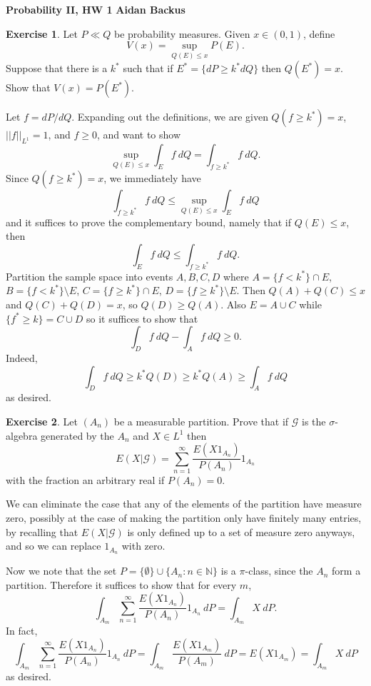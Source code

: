 \documentclass[10pt]{article}
\newcommand{\NN}{\mathbb{N}}
\theoremstyle{definition}
\newtheorem{exer}{Exercise}
\begin{document}
\noindent
\large\textbf{Probability II, HW 1} \hfill \textbf{Aidan Backus} \\

\begin{exer}
Let $P \ll Q$ be probability measures. Given $x \in (0, 1)$, define
$$V(x) = \sup_{Q(E) \leq x} P(E).$$
Suppose that there is a $k^*$ such that if $E^* = \{dP \geq k^* dQ\}$ then $Q(E^*) = x$.
Show that $V(x) = P(E^*)$.
\end{exer}

Let $f = dP/dQ$. Expanding out the definitions, we are given $Q(f \geq k^*) = x$, $||f||_{L^1} = 1$, and $f \geq 0$, and want to show
$$\sup_{Q(E) \leq x} \int_E f~dQ = \int_{f \geq k^*} f ~dQ.$$
Since $Q(f \geq k^*) = x$, we immediately have
$$\int_{f \geq k^*} f ~dQ \leq \sup_{Q(E) \leq x} \int_E f~dQ$$
and it suffices to prove the complementary bound, namely that if $Q(E) \leq x$, then
$$\int_E f ~dQ \leq \int_{f \geq k^*} f~dQ.$$
Partition the sample space into events $A,B,C,D$ where $A = \{f < k^*\} \cap E$, $B = \{f < k^*\} \setminus E$, $C = \{f \geq k^*\} \cap E$, $D = \{f \geq k^*\} \setminus E$.
Then $Q(A) + Q(C) \leq x$ and $Q(C) + Q(D) = x$, so $Q(D) \geq Q(A)$.
Also $E = A \cup C$ while $\{f^* \geq k\} = C \cup D$ so it suffices to show that
$$\int_D f~dQ - \int_A f~dQ \geq 0.$$
Indeed,
$$\int_D f~dQ \geq k^*Q(D) \geq k^*Q(A) \geq \int_A f~dQ$$
as desired.


\begin{exer}
Let $(A_n)$ be a measurable partition. Prove that if $\mathcal G$ is the $\sigma$-algebra generated by the $A_n$ and $X \in L^1$ then
$$E(X|\mathcal G) = \sum_{n=1}^\infty \frac{E(X1_{A_n})}{P(A_n)} 1_{A_n}$$
with the fraction an arbitrary real if $P(A_n) = 0$.
\end{exer}

We can eliminate the case that any of the elements of the partition have measure zero, possibly at the case of making the partition only have finitely many entries, by recalling that $E(X|\mathcal G)$ is only defined up to a set of measure zero anyways, and so we can replace $1_{A_n}$ with zero.

Now we note that the set $P = \{\emptyset\} \cup \{A_n: n \in \NN\}$ is a $\pi$-class, since the $A_n$ form a partition.
Therefore it suffices to show that for every $m$,
$$\int_{A_m} \sum_{n=1}^\infty \frac{E(X1_{A_n})}{P(A_n)} 1_{A_n}~dP = \int_{A_m} X ~dP.$$
In fact,
$$\int_{A_m} \sum_{n=1}^\infty \frac{E(X1_{A_n})}{P(A_n)} 1_{A_n}~dP = \int_{A_m} \frac{E(X1_{A_m})}{P(A_m)} ~dP = E(X1_{A_m}) = \int_{A_m} X~dP$$
as desired.
\end{document}

